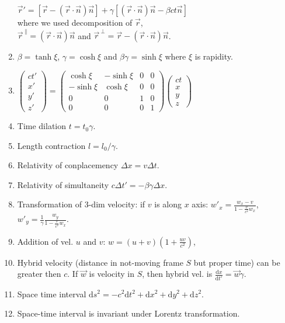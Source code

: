 \documentclass{article}
\renewcommand\d{\mathrm d}
\begin{document}
\begin{multicols}{3}
\begin{enumerate}
            $\vec r'=\left[\vec r-(\vec r\cdot\vec n)\vec n\right]+\gamma\left[(\vec r\cdot\vec n)\vec n-\beta ct\vec n\right]$\\
            where we used decomposition of $\vec r$,\\ $\vec r^{~\parallel}=(\vec r\cdot\vec n)\vec n$ and $\vec r^{~\perp}=\vec r-(\vec r\cdot\vec n)\vec n$.
        \item $\beta=\tanh\xi$, $\gamma=\cosh\xi$ and $\beta\gamma=\sinh\xi$ where $\xi$ is rapidity.
        \item
        $\begin{pmatrix}
            ct'\\ x'\\ y' \\ z'
        \end{pmatrix}
        =\begin{pmatrix}
            \cosh\xi & -\sinh\xi & 0 & 0\\
            -\sinh\xi & \cosh\xi & 0 & 0\\
            0 & 0 & 1 & 0\\
            0 & 0 & 0 & 1
        \end{pmatrix}
        \begin{pmatrix}
            ct\\ x\\ y \\ z
        \end{pmatrix}$
        \item Time dilation $t=t_0\gamma$.
        \item Length contraction $l=l_0/\gamma$.
        \item Relativity of conplacemency $\Delta x=v\Delta t$.
        \item Relativity of simultaneity $c\Delta t'=-\beta\gamma\Delta x$.
        \item Transformation of 3-dim velocity: if $v$ is along $x$ axis:
            $w'_x=\frac{w_x-v}{1-\frac{v}{c^2}w_x}$,
            $w'_y=\frac{1}{\gamma}\frac{w_y}{1-\frac{v}{c^2}w_x}$.
        \item Addition of vel. $u$ and $v$: $w=(u+v)\left(1+\frac{uv}{c^2}\right)$,
        \item Hybrid velocity (distance in not-moving frame $S$ but proper time) can be greater then $c$. If $\vec w$ is velocity in $S$, then hybrid vel. is $\frac{\d x}{\d t'}=\vec w\gamma$.
        \item Space time interval $\d s^2=-c^2\d t^2+\d x^2+\d y^2+\d z^2$.
        \item Space-time interval is invariant under Lorentz transformation.
    \end{enumerate}



\end{multicols}
\end{document}
